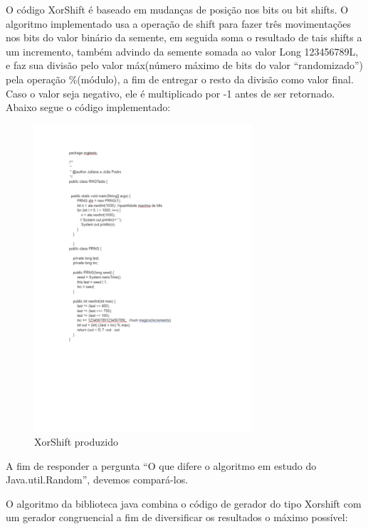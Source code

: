 O código XorShift é baseado em mudanças de posição nos bits ou bit shifts. O algoritmo implementado usa a operação de shift para fazer três movimentações nos bits do valor binário da semente, em seguida soma o resultado de tais shifts a um incremento, também advindo da semente somada ao valor Long 123456789L, e faz sua divisão pelo valor máx(número máximo de bits do valor “randomizado”) pela operação \%(módulo), a fim de entregar o resto da divisão como valor final. Caso o valor seja negativo, ele é multiplicado por -1 antes de ser retornado.
\\
Abaixo segue o código implementado:
\begin{figure}[H]
            \centering
                \includegraphics[width=0.72\textwidth]{codigorandom1.pdf}
                \caption{XorShift produzido}
                \label{fig:Desempenho}
        \end{figure} 
A fim de responder a pergunta “O que difere o algoritmo em estudo do Java.util.Random”, devemos compará-los.

O algoritmo da biblioteca java combina o código de gerador do tipo Xorshift com um gerador congruencial a fim de diversificar os resultados o máximo possível:

